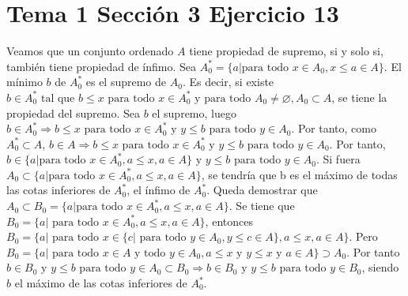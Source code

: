\documentclass{article}
\begin{document}
\section{Tema 1 Sección 3 Ejercicio 13}
Veamos que un conjunto ordenado \(A\) tiene propiedad de supremo, si y solo si, también tiene propiedad de ínfimo. Sea \(A^*_ 0=\{a|\text{para todo }x\in A_0, x\leq a \in A\}\). El mínimo \(b\) de \(A^*_0\) es el supremo de \(A_0\). Es decir, si existe \(b\in A^*_0 \text{ tal que } b\leq x \text{ para todo } x\in A^*_0 \text{ y para todo } A_0 \neq \varnothing, A_0 \subset A\), se tiene la propiedad del supremo. Sea \(b\) el supremo, luego \(b\in A^*_0 \Rightarrow b\leq x \text{ para todo } x \in A^*_0 \text{ y } y\leq b\text{ para todo } y\in A_0 \). Por tanto, como \(A^*_0\subset A\), \(b\in A \Rightarrow b\leq x \text{ para todo } x \in A^*_0 \text{ y } y\leq b\text{ para todo } y\in A_0 \). Por tanto, \(b\in \{a|\text{para todo }x\in A^*_0, a\leq x, a \in A\}\text{ y } y\leq b\text{ para todo } y\in A_0 \). Si fuera \(A_0 \subset\{a|\text{para todo }x\in A^*_0, a\leq x, a \in A\}\), se tendría que b es el máximo de todas las cotas inferiores de \(A^*_0\), el ínfimo de \(A^*_0\). Queda demostrar que \(A_0 \subset B_0=\{a|\text{para todo }x\in A^*_0, a\leq x, a \in A\}\). Se tiene que \(B_0= \{a|\text{ para todo }x\in A^*_0, a\leq x, a \in A\}\), entonces \(B_0 = \{a|\text{ para todo }x\in \{c|\text{ para todo }y\in A_0, y\leq c \in A\}, a\leq x, a \in A\}\). Pero \(B_0= \{a|\text{ para todo }x \in A\text{ y todo } y\in A_0,  a \leq x \text{ y } y\leq x \text{ y } a\in A\}\supset A_0\). Por tanto \(b\in B_0 \text{ y } y\leq b\text{ para todo } y\in A_0\subset B_0 \Rightarrow b\in B_0 \text{ y } y\leq b\text{ para todo } y\in B_0\), siendo \(b\) el máximo de las cotas inferiores de \(A^*_0\).
%
%
\end{document}
